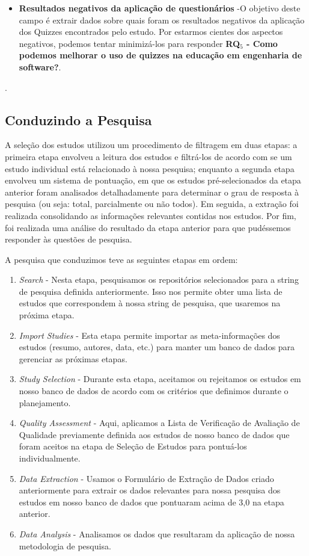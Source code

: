 \begin{itemize}
    \item\textbf{Resultados negativos da aplicação de questionários} -O objetivo deste campo é extrair dados sobre quais foram os resultados negativos da aplicação dos Quizzes encontrados pelo estudo. Por estarmos cientes dos aspectos negativos, podemos tentar minimizá-los para responder \textbf{RQ$_5$ -  Como podemos melhorar o uso de quizzes na educação em engenharia de software?}.
\end{itemize}.

\subsection{Conduzindo a Pesquisa}

A seleção dos estudos utilizou um procedimento de filtragem em duas etapas: a primeira etapa envolveu a leitura dos estudos e filtrá-los de acordo com se um estudo individual está relacionado à nossa pesquisa; enquanto a segunda etapa envolveu um sistema de pontuação, em que os estudos pré-selecionados da etapa anterior foram analisados detalhadamente para determinar o grau de resposta à pesquisa (ou seja: total, parcialmente ou não todos). Em seguida, a extração foi realizada consolidando as informações relevantes contidas nos estudos. Por fim, foi realizada uma análise do resultado da etapa anterior para que pudéssemos responder às questões de pesquisa.

A pesquisa que conduzimos teve as seguintes etapas em ordem:
\begin{enumerate}

    \item \emph{Search} - Nesta etapa, pesquisamos os repositórios selecionados para a string de pesquisa definida anteriormente. Isso nos permite obter uma lista de estudos que correspondem à nossa string de pesquisa, que usaremos na próxima etapa.

    \item \emph{Import Studies} - Esta etapa permite importar as meta-informações dos estudos (resumo, autores, data, etc.) para manter um banco de dados para gerenciar as próximas etapas.

    \item \emph{Study Selection} - Durante esta etapa, aceitamos ou rejeitamos os estudos em nosso banco de dados de acordo com os critérios que definimos durante o planejamento.

    \item \emph{Quality Assessment} - Aqui, aplicamos a Lista de Verificação de Avaliação de Qualidade previamente definida aos estudos de nosso banco de dados que foram aceitos na etapa de Seleção de Estudos para pontuá-los individualmente.

    \item \emph{Data Extraction} - Usamos o Formulário de Extração de Dados criado anteriormente para extrair os dados relevantes para nossa pesquisa dos estudos em nosso banco de dados que pontuaram acima de 3,0 na etapa anterior.
    

    \item \emph{Data Analysis} - Analisamos os dados que resultaram da aplicação de nossa metodologia de pesquisa.
\end{enumerate}


